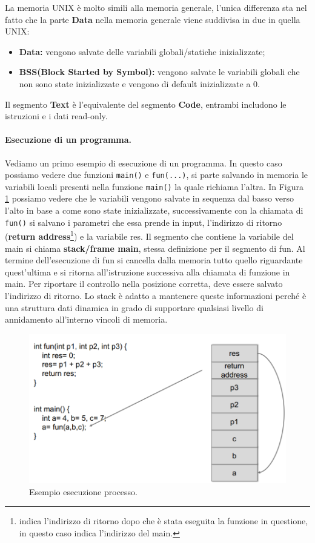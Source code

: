 La memoria UNIX è molto simili alla memoria generale, l'unica differenza sta nel fatto che la parte \textbf{Data} nella memoria generale viene suddivisa in due in quella UNIX:
\begin{itemize}
    \item \textbf{Data:} vengono salvate delle variabili globali/statiche inizializzate;
    \item \textbf{BSS(Block Started by Symbol):} vengono salvate le variabili globali che non sono state inizializzate e vengono di default inizializzate a 0.
\end{itemize}
Il segmento \textbf{Text} è l'equivalente del segmento \textbf{Code}, entrambi includono le istruzioni e i dati read-only.

\paragraph{Esecuzione di un programma.}
Vediamo un primo esempio di esecuzione di un programma. In questo caso possiamo vedere due funzioni \verb|main()| e \verb|fun(...)|, si parte salvando in memoria le variabili locali presenti nella funzione \verb|main()| la quale richiama l'altra. In Figura \ref{fig:es_esec_processo} possiamo vedere che le variabili vengono salvate in sequenza dal basso verso l'alto in base a come sono state inizializzate, successivamente con la chiamata di \verb|fun()| si salvano i parametri che essa prende in input, l'indirizzo di ritorno (\textbf{return address}\footnote{indica l'indirizzo di ritorno dopo che è stata eseguita la funzione in questione, in questo caso indica l'indirizzo del main.}) e la variabile res. Il segmento che contiene la variabile del main si chiama \textbf{stack/frame main}, stessa definizione per il segmento di fun. Al termine dell'esecuzione di fun si cancella dalla memoria tutto quello riguardante quest'ultima e si ritorna all'istruzione successiva alla chiamata di funzione in main. Per riportare il controllo nella posizione corretta, deve essere salvato l'indirizzo di ritorno. Lo stack è adatto a mantenere queste informazioni perché è una struttura dati dinamica in grado di supportare qualsiasi livello di annidamento all'interno vincoli di memoria.
\begin{figure}[H]
    \centering
    \includegraphics[width=13cm, keepaspectratio]{capitoli/secure_coding/img/cap_2/es_esecuzione_processo.png}
    \caption{Esempio esecuzione processo.}\label{fig:es_esec_processo}
\end{figure}
